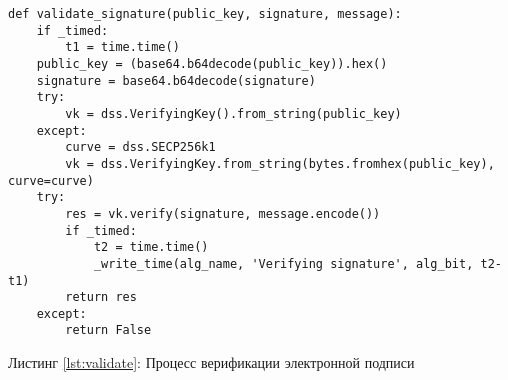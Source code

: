 \begin{center}
\begin{lstlisting}
def validate_signature(public_key, signature, message):
    if _timed:
        t1 = time.time()
    public_key = (base64.b64decode(public_key)).hex()
    signature = base64.b64decode(signature)
    try:
        vk = dss.VerifyingKey().from_string(public_key)
    except:
        curve = dss.SECP256k1
        vk = dss.VerifyingKey.from_string(bytes.fromhex(public_key), curve=curve)
    try:
        res = vk.verify(signature, message.encode())
        if _timed:
            t2 = time.time()
            _write_time(alg_name, 'Verifying signature', alg_bit, t2-t1)
        return res
    except:
        return False
\end{lstlisting}\label{lst:validate}
    Листинг \ref{lst:validate}: Процесс верификации электронной подписи
\end{center}
